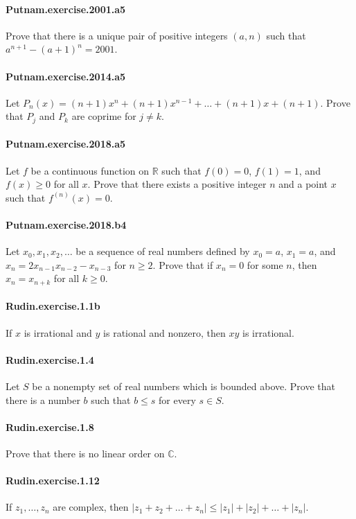 \documentclass{article}
\begin{document}
\paragraph{Putnam.exercise.2001.a5} Prove that there is a unique pair of positive integers $(a, n)$ such that $a^{n+1} - (a+1)^n = 2001$.

\paragraph{Putnam.exercise.2014.a5} Let $P_n(x) = (n+1)x^n + (n+1)x^{n-1} + \dots + (n+1)x + (n+1)$. Prove that $P_j$ and $P_k$ are coprime for $j\neq k$.

\paragraph{Putnam.exercise.2018.a5} Let $f$ be a continuous function on $\mathbb{R}$ such that $f(0)=0$, $f(1)=1$, and $f(x)\geq 0$ for all $x$. Prove that there exists a positive integer $n$ and a point $x$ such that $f^{(n)}(x)=0$.

\paragraph{Putnam.exercise.2018.b4} Let $x_0, x_1, x_2, \dots$ be a sequence of real numbers defined by $x_0=a$, $x_1=a$, and $x_n=2x_{n-1}x_{n-2}-x_{n-3}$ for $n\geq 2$. Prove that if $x_n=0$ for some $n$, then $x_n=x_{n+k}$ for all $k\geq 0$.

\paragraph{Rudin.exercise.1.1b} If $x$ is irrational and $y$ is rational and nonzero, then $xy$ is irrational.

\paragraph{Rudin.exercise.1.4} Let $S$ be a nonempty set of real numbers which is bounded above. Prove that there is a number $b$ such that $b\leq s$ for every $s\in S$.

\paragraph{Rudin.exercise.1.8} Prove that there is no linear order on $\mathbb{C}$.

\paragraph{Rudin.exercise.1.12} If $z_1, \dots, z_n$ are complex, then $|z_1 + z_2 + \dots + z_n|\leq |z_1| + |z_2| + \dots + |z_n|$.
\end{document}

